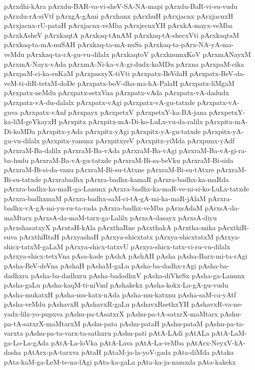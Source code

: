 {pArxdhi-kAra
pArxdu-BAR-va-vi-sheV-SA-NA-mapi
pArxdu-BaR-vi-su-vudu
pArxdu-rA-siVtf
pArxgA-gAmi
pArxhanx
pArxhuH
pArxjacnx
pArxjacnxH
pArxjacnx-rU-pataH
pArxjacnx-veMba
pArxjecnxYH
pArxkA-mayx-veMba
pArxkAsheV
pArxkaqtA
pArxkaq-tAnAM
pArxkaq-tA-shecxVti
pArxkaqtaM
pArxkaq-ta-mA-nuSAH
pArxkaq-ta-mA-nuSa
pArxkaq-ta-pArx-NA-yA-ma-veMdu
pArxkaq-ta-rA-gu-vu-dilalx
pArxkaqtoV
pArxknumxKoV
pArxmANayxM
pArxmA-Nayx-vAda
pArxmA-Ni-ka-vA-gi-dudx-koMDu
pArxna
pArxpaM-cika
pArxpaM-ci-ka-suKaM
pArxpasxyX-tiVti
pArxpatx-BeVdaH
pArxpatx-BeV-da-veM-ti-diR-tetxM-doDe
pArxpatx-boV-dha-ma-hA-PalaH
pArxpatx-liMgaM
pArxpatx-neMdu
pArxpatx-setxVna
pArxpatx-vAda
pArxpatx-vA-dadudx
pArxpatx-vA-du-dalalx
pArxpatx-vAgi
pArxpatx-vA-gu-tatxde
pArxpatx-vA-guva
pArxpatx-vAnf
pArxpayx
pArxpetxV
pArxpetxY-ka-BA-jana
pArxpetxY-ka-liM-geYkayxH
pArxpitx
pArxpitx-mA-Di-ko-LuLx-vu-da-ralilx
pArxpitx-mA-Di-koMDa
pArxpitx-yAda
pArxpitx-yAgi
pArxpitx-yA-gu-tatxde
pArxpitx-yA-gu-vu-dilalx
pArxpitx-yanunx
pArxpitxyeV
pArxpitx-yiMda
pArxpunx-yAdf
pArxraM-Ba-dalilx
pArxraM-Ba-vAda
pArxraM-Ba-vAgi
pArxraM-Ba-vA-gi-ra-ba-hudu
pArxraM-Ba-vA-gu-tatxde
pArxraM-Bi-sa-beVku
pArxraM-Bi-sida
pArxraM-Bi-si-da-vanu
pArxraM-Bi-su-tAtxne
pArxraM-Bi-su-tAtxre
pArxraM-Bi-su-tatxde
pArxrabadhx
pArxra-badhx-kamaR
pArxra-badhx-ka-maRda
pArxra-badhx-ka-maR-ga-Lanunx
pArxra-badhx-ka-maR-ve-ni-si-ko-LuLx-tatxde
pArxra-badhxmaM
pArxra-badhx-saM-ci-tA-gA-mi-ka-maR-jAlaM
pArxra-badhx-vA-gA-mi-yu-ru-ta-rada
pArxra-badhx-veMba
pArxsAdaM
pArxsA-da-maMtarx
pArxsA-da-maM-tarx-ga-Lalilx
pArxsA-dasayx
pArxsA-diyu
pArxshasatxyX
pArxtaH-kAla
pArxthaRne
pArxthakA
pArxtha-mika
pArxthiR-suva
pArxthiRtaH
pArxyashaH
pArxya-shicxtatx
pArxya-shicxtatxM
pArxya-shicx-tatxM-gaLaM
pArxya-shicx-tatxvU
pArxya-shicx-tatx-vi-ru-vu-dilalx
pArxya-shicx-tetxVna
pAsa-kade
pAshA
pAshAH
pAsha
pAsha-Barx-mi-ta-rAgi
pAsha-BeV-deVna
pAshaH
pAshaM-gaLu
pAsha-ba-dadhx-rAgi
pAsha-ba-dadhxra
pAsha-ba-dadhxru
pAsha-badodhxV
pAsha-diVkeSx
pAsha-ga-Lanunx
pAsha-gaLu
pAsha-kaqM-ti-niVmf
pAshakekx
pAsha-kokx-La-gA-gu-vudu
pAsha-mukatxH
pAsha-mu-katx-nAda
pAsha-mu-katxnu
pAsha-saM-ca-yAtf
pAsha-veMdu
pAshavxR
pAshavxR-gaLu
pAshavxRsethxYH
pAshavxR-va-ne-yadx-lilx-yo-pupxva
pAshu-pa-tAsatxrX
pAshu-pa-tA-satxrX-maMtarx
pAshu-pa-tA-satxrX-maMtarxM
pAshu-pata
pAshu-pataH
pAshu-pataM
pAshu-pa-ta-varxta
pAshu-pa-ta-varx-ta-sathxru
pAshu-pati
pAtA-LAdi
pAtALa
pAtA-LaM-ga-Lo-La-gAda
pAtA-La-loVka
pAtA-Lava
pAtA-La-veMba
pAtArx-NeyxV-kA-dasha
pAtArx-pA-tarxva
pAtaH
pAtaM-ja-la-yoV-gada
pAta-diMda
pAtaka
pAta-kaM-ga-LeM-te-na-lAgi
pAta-ka-gaLa
pAta-ka-ja-namxda
pAta-kakekx
}

